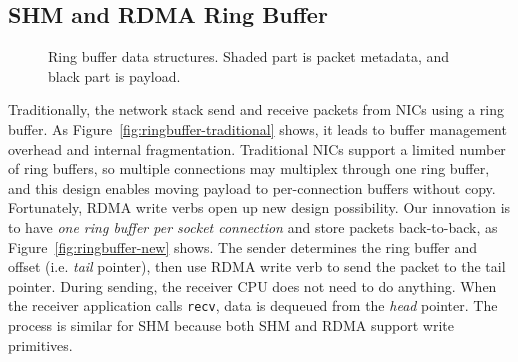 \subsection{SHM and RDMA Ring Buffer}
\label{subsec:lockless-queue}

\begin{figure}[t]
	\centering
	\hspace{0.02\textwidth}
	\vspace{-10pt}
	\caption{Ring buffer data structures. Shaded part is packet metadata, and black part is payload.}
\end{figure}


Traditionally, the network stack send and receive packets from NICs using a ring buffer.
As Figure~\ref{fig:ringbuffer-traditional} shows, it leads to buffer management overhead and internal fragmentation.
Traditional NICs support a limited number of ring buffers, so multiple connections may multiplex through one ring buffer, and this design enables moving payload to per-connection buffers without copy.
Fortunately, RDMA write verbs open up new design possibility.
Our innovation is to have \emph{one ring buffer per socket connection} and store packets back-to-back, as Figure~\ref{fig:ringbuffer-new} shows.
The sender determines the ring buffer and offset (i.e. \emph{tail} pointer), then use RDMA write verb to send the packet to the tail pointer.
During sending, the receiver CPU does not need to do anything.
When the receiver application calls \texttt{recv}, data is dequeued from the \emph{head} pointer.
The process is similar for SHM because both SHM and RDMA support write primitives.

